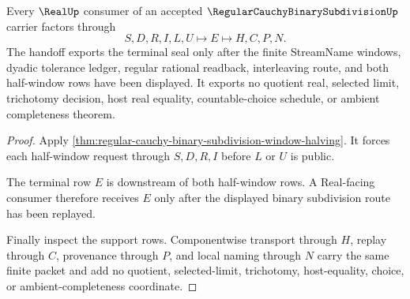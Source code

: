 \begin{theorem}
\label{thm:regular-cauchy-binary-subdivision-real-seal-handoff}
Every $\RealUp$ consumer of an accepted $\RegularCauchyBinarySubdivisionUp$ carrier factors through
$$
S,D,R,I,L,U \longmapsto E \longmapsto H,C,P,N .
$$
The handoff exports the terminal seal only after the finite StreamName windows, dyadic tolerance ledger, regular rational readback, interleaving route, and both half-window rows have been displayed. It exports no quotient real, selected limit, trichotomy decision, host real equality, countable-choice schedule, or ambient completeness theorem.
\end{theorem}
\begin{proof}
Apply \autoref{thm:regular-cauchy-binary-subdivision-window-halving}. It forces each half-window request through $S,D,R,I$ before $L$ or $U$ is public.

The terminal row $E$ is downstream of both half-window rows. A Real-facing consumer therefore receives $E$ only after the displayed binary subdivision route has been replayed.

Finally inspect the support rows. Componentwise transport through $H$, replay through $C$, provenance through $P$, and local naming through $N$ carry the same finite packet and add no quotient, selected-limit, trichotomy, host-equality, choice, or ambient-completeness coordinate.
\end{proof}




